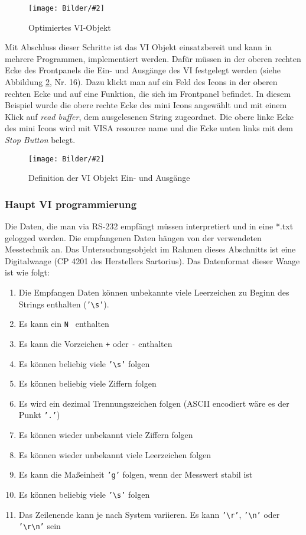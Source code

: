 \documentclass[
fontsize=12pt, 
paper=a4, 
BCOR=10mm, 
twoside=false,
 DIV=10, 
 headsepline, 
 footsepline
 ]{scrartcl}
\def\bild#1#2#3#4#5#6{%
\begin{figure}[h!] %
\centering
\texttt{[image: Bilder/\#2]}
\vspace{#3}
\caption[#4]{#5}\label{#6}
\end{figure}
}
\begin{document}
\bild{1}
{LabVIEW_serialport/step5_optimierung.png}
{0em}
{Optimiertes VI-Objekt}
{Optimiertes VI-Objekt}
{step5}

Mit Abschluss dieser Schritte ist das VI Objekt einsatzbereit und kann in mehrere Programmen, implementiert werden. Dafür müssen in der oberen rechten Ecke des Frontpanels die Ein- und Ausgänge des VI festgelegt werden (siehe Abbildung \ref{step4}, Nr. 16). Dazu klickt man auf ein Feld des Icons in der oberen rechten Ecke und auf eine Funktion, die sich im Frontpanel befindet. In diesem Beispiel wurde die obere rechte Ecke des mini Icons angewählt und mit einem Klick auf \textit{read buffer}, dem ausgelesenen String zugeordnet. Die obere linke Ecke des mini Icons wird mit VISA resource name und die Ecke unten links mit dem \textit{Stop Button} belegt.

\bild{.4}
{LabVIEW_serialport/step_4_VI_generieren_3.png}
{0em}
{Definition der VI Objekt Ein- und Ausgänge}
{Definition der VI Objekt Ein- und Ausgänge}
{step4}


\subsubsection{Haupt VI programmierung}

Die Daten, die man via RS-232 empfängt müssen interpretiert und in eine *.txt gelogged werden. Die empfangenen Daten hängen von der verwendeten Messtechnik an. Das Untersuchungsobjekt im Rahmen dieses Abschnitts ist eine Digitalwaage (CP 4201 des Herstellers Sartorius). Das Datenformat dieser Waage ist wie folgt:

\begin{enumerate}
\item Die Empfangen Daten können unbekannte viele Leerzeichen zu Beginn des Strings enthalten (\texttt{'\textbackslash s'}). 
\item Es kann ein \texttt{N } enthalten
\item Es kann die Vorzeichen \texttt{+} oder \texttt{-} enthalten
\item Es können beliebig viele \texttt{'\textbackslash s'} folgen
\item Es können beliebig viele Ziffern folgen
\item Es wird ein dezimal Trennungszeichen folgen (ASCII encodiert wäre es der Punkt \texttt{'.'})
\item Es können wieder unbekannt viele Ziffern folgen
\item Es können wieder unbekannt viele Leerzeichen folgen
\item Es kann die Maßeinheit \texttt{'g'} folgen, wenn der Messwert stabil ist
\item Es können beliebig viele \texttt{'\textbackslash s'} folgen
\item Das Zeilenende kann je nach System variieren. Es kann \texttt{'\textbackslash r'}, \texttt{'\textbackslash n'} oder \texttt{'\textbackslash r\textbackslash n'} sein
\end{enumerate}
\end{document}
